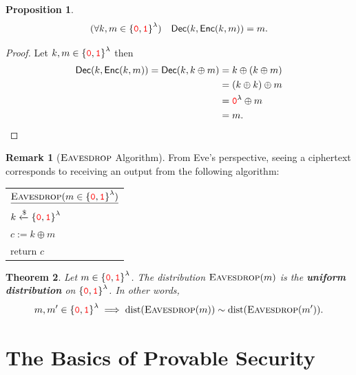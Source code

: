 \documentclass[12pt,openany]{book}
\newtheorem{theorem}{Theorem}[chapter]
\newtheorem{proposition}[theorem]{Proposition}
\theoremstyle{definition}
\newtheorem{remark}{Remark}[chapter]
\newcommand{\Enc}{\mathsf{Enc}}
\newcommand{\Dec}{\mathsf{Dec}}
\newcommand{\zero}{\textcolor{red}{\texttt{0}}}
\newcommand{\one}{\textcolor{red}{\texttt{1}}}
\newcommand{\tab}{\hspace{12pt}}
\newcommand{\xor}{\oplus}
\newcommand{\randomness}{\$}
\newcommand{\uniform}{\xleftarrow{\randomness}}
\newcommand{\binaryfield}{\set{\zero,\one}}
\newcommand{\eavesdrop}{\operatorname{\textsc{Eavesdrop}}}
\begin{document}
	\newpage
	\begin{tcolorbox}[colback=white,colframe=procolor,arc=5pt,title={\color{white}\bf Correctness of OTP}]
		\begin{proposition}
			\[
			(\forall k,m\in\binaryfield^\lambda)\quad\Dec(k,\Enc(k,m))=m.
			\]
		\end{proposition}
	\end{tcolorbox}
	\begin{proof}
		Let \(k,m\in\binaryfield^\lambda\) then \begin{align*}
			\Dec(k,\Enc(k,m))=\Dec(k,k\xor m)&=k\xor(k\xor m)\\
			&=(k\xor k)\xor m\\
			&=\zero^\lambda\xor m\\
			&=m.
		\end{align*}
	\end{proof}
	\vspace{24pt}
	\begin{remark}[$\eavesdrop$ Algorithm]
		From Eve’s perspective, seeing a ciphertext corresponds to receiving
		an output from the following algorithm: \\ \begin{center}
		\begin{tabular}{|l|}
			\hline
			\(\underline{\eavesdrop (m\in\binaryfield^\lambda)}\)\\
			\tab\(k\uniform\binaryfield^\lambda\)\\
			\tab\(c:=k\xor m\)\\
			\tab return \(c\)\\
			\hline
		\end{tabular}
		\end{center}
	\end{remark}

	\begin{tcolorbox}[colback=white,colframe=thmcolor,arc=5pt,title={\color{white}\bf }]
		\begin{theorem}
			Let \(m\in\binaryfield^\lambda\). The distribution \(\eavesdrop(m)\) is the \textbf{uniform distribution} on \(\binaryfield^\lambda\). In other words, \[
			m,m'\in\binaryfield^\lambda\implies\textnormal{dist}(\eavesdrop(m))\sim\textnormal{dist}(\eavesdrop(m')).
			\]
		\end{theorem}
	\end{tcolorbox}
	
	\chapter{The Basics of Provable Security}
	
\end{document}
